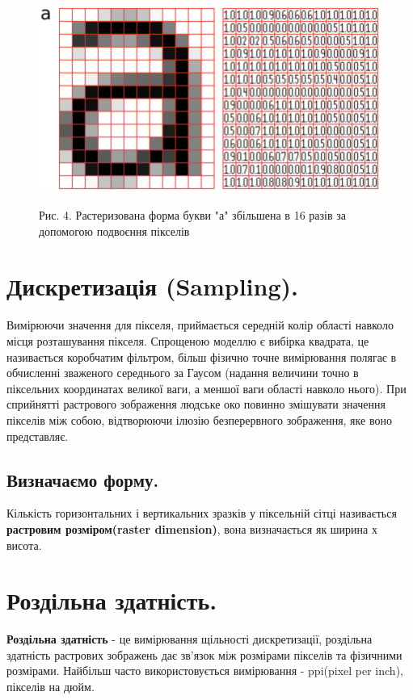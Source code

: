 \documentclass[11pt]{article}
\begin{document}
    \begin{figure}
        \label{fig:image4}
        \centering
        \includegraphics[scale=0.5]{image4.png}

        Рис. 4. Растеризована форма букви "а" збільшена в 16 разів за допомогою подвоєння пікселів
    \end{figure}

    \section{Дискретизація (Sampling).}\label{sec:sampling}
    Вимірюючи значення для пікселя, приймається середній колір області навколо місця розташування пікселя.
    Спрощеною моделлю є вибірка квадрата, це називається коробчатим фільтром, більш фізично точне вимірювання полягає в обчисленні зваженого середнього за Гаусом (надання величини точно в піксельних координатах великої ваги, а меншої ваги області навколо нього).
    При сприйнятті растрового зображення людське око повинно змішувати значення пікселів між собою, відтворюючи ілюзію безперервного зображення, яке воно представляє.

    \subsection{Визначаємо форму.}\label{subsec:raster_sdimensions}
    Кількість горизонтальних і вертикальних зразків у піксельній сітці називається \textbf{растровим розміром(raster dimension)}, вона визначається як ширина х висота.

    \section{Роздільна здатність.}\label{sec:resolution}
    \textbf{Роздільна здатність} - це вимірювання щільності дискретизації, роздільна здатність растрових зображень дає зв'язок між розмірами пікселів та фізичними розмірами.
    Найбільш часто використовується вимірювання - ppi(pixel per inch), пікселів на дюйм.
\end{document}
